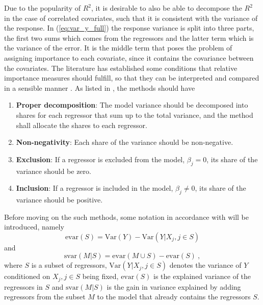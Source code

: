 \newline
\newline
Due to the popularity of $R^2$, it is desirable to also be able to decompose the $R^2$ in the case of correlated covariates, such that it is consistent with the variance of the response.
In (\ref{eq:var_y_full}) the response variance is split into three parts, the first two sums which comes from the regressors and the latter term which is the variance of the error. 
It is the middle term that poses the problem of assigning importance to each covariate, since it contains the covariance between the covariates.
The literature has established some conditions that relative importance measures should fulfill, so that they can be interpreted and compared in a sensible manner \citep{gromping_relaimpo}. As listed in \citet{gromping_relaimpo}, the methods should have
\begin{enumerate}
    \label{list:criteria}
    \item \textbf{Proper decomposition}: The model variance should be decomposed into shares for each regressor that sum up to the total variance, and the method shall allocate the shares to each regressor.
    \item \textbf{Non-negativity}: Each share of the variance should be non-negative.
    \item \textbf{Exclusion}: If a regressor is excluded from the model, $\beta_j=0$, its share of the variance should be zero.
    \item \textbf{Inclusion}: If a regressor is included in the model, $\beta_j \neq 0$, its share of the variance should be positive.
\end{enumerate}
Before moving on the such methods, some notation in accordance with \citet{gromping_relaimpo} will be introduced, namely
\begin{equation}
    \text{evar}(S) = \text{Var}(Y) - \text{Var}(Y \lvert X_j, j\in S) 
\end{equation} 
and
\begin{equation}
    \text{svar}(M \lvert S) = \text{evar}(M \cup S) - \text{evar}(S) \ ,
\end{equation} 
where $S$ is a subset of regressors, $\text{Var}(Y \lvert X_j, j\in S)$ denotes the variance of $Y$ conditioned on $X_j, j\in S$ being fixed, $\text{evar}(S)$ is the explained variance of the regressors in $S$ and $\text{svar}(M \lvert S)$ is the gain in variance explained by adding regressors from the subset $M$ to the model that already contains the regressors $S$. 


